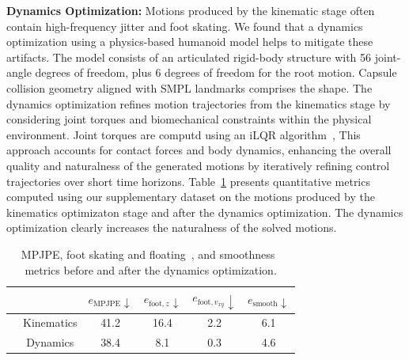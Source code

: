 \documentclass{egpubl}
\begin{document}
\textbf{Dynamics Optimization:} Motions produced by the kinematic stage often contain high-frequency jitter and foot skating. We found that a dynamics optimization using a physics-based humanoid model helps to mitigate these artifacts. The model consists of an articulated rigid-body structure with 56 joint-angle degrees of freedom, plus 6 degrees of freedom for the root motion. Capsule collision geometry aligned with SMPL landmarks comprises the shape. The dynamics optimization refines motion trajectories from the kinematics stage by considering joint torques and biomechanical constraints within the physical environment. Joint torques are computd using an iLQR algorithm~\cite{howell2022}, This approach accounts for contact forces and body dynamics, enhancing the overall quality and naturalness of the generated motions by iteratively refining control trajectories over short time horizons. Table~\ref{tab:physics} presents quantitative metrics computed using our supplementary dataset on the motions produced by the kinematics optimizaton stage and after the dynamics optimization. The dynamics optimization clearly increases the naturalness of the solved motions.


\begin{table}[h]
    \caption{MPJPE, foot skating and floating~\cite{Xie:2021aa}, and smoothness~\cite{Shimada_2020} metrics before and after the dynamics optimization.}
    \centering
    \begin{tabular}{cccccc}
        \toprule
        & \, & $e_{\text{MPJPE}}\downarrow$ & $e_{\text{foot},z}\downarrow$ & $e_{\text{foot},v_{xy}}\downarrow$ & $e_{\text{smooth}}\downarrow$ \\
        \midrule
        \midrule
        & Kinematics & 41.2 &  16.4 & 2.2 & 6.1 \\
        & Dynamics & 38.4 & 8.1 & 0.3 & 4.6 \\
        \bottomrule
    \end{tabular}
    \label{tab:physics}
    \vspace{-12pt}
\end{table}

 
 
\end{document}
